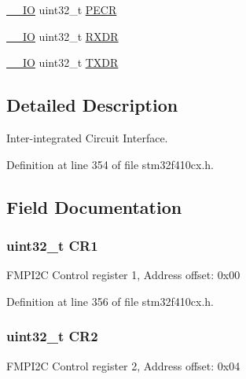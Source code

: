 \begin{DoxyCompactItemize}
\item 
\hyperlink{core__sc300_8h_aec43007d9998a0a0e01faede4133d6be}{\+\_\+\+\_\+\+IO} uint32\+\_\+t \hyperlink{struct_f_m_p_i2_c___type_def_af427631ab4515bb1f16bf5869682c18b}{P\+E\+CR}
\item 
\hyperlink{core__sc300_8h_aec43007d9998a0a0e01faede4133d6be}{\+\_\+\+\_\+\+IO} uint32\+\_\+t \hyperlink{struct_f_m_p_i2_c___type_def_a9bf29a9104cb5569823ab892174f9c8c}{R\+X\+DR}
\item 
\hyperlink{core__sc300_8h_aec43007d9998a0a0e01faede4133d6be}{\+\_\+\+\_\+\+IO} uint32\+\_\+t \hyperlink{struct_f_m_p_i2_c___type_def_ad7e8d785fff2acfeb8814e43bda8dd72}{T\+X\+DR}
\end{DoxyCompactItemize}


\subsection{Detailed Description}
Inter-\/integrated Circuit Interface. 

Definition at line 354 of file stm32f410cx.\+h.



\subsection{Field Documentation}
\subsubsection[{\texorpdfstring{C\+R1}{CR1}}]{ uint32\+\_\+t C\+R1}\hypertarget{struct_f_m_p_i2_c___type_def_ab0ec7102960640751d44e92ddac994f0}{}\label{struct_f_m_p_i2_c___type_def_ab0ec7102960640751d44e92ddac994f0}
F\+M\+P\+I2C Control register 1, Address offset\+: 0x00 

Definition at line 356 of file stm32f410cx.\+h.

\subsubsection[{\texorpdfstring{C\+R2}{CR2}}]{ uint32\+\_\+t C\+R2}\hypertarget{struct_f_m_p_i2_c___type_def_afdfa307571967afb1d97943e982b6586}{}\label{struct_f_m_p_i2_c___type_def_afdfa307571967afb1d97943e982b6586}
F\+M\+P\+I2C Control register 2, Address offset\+: 0x04 

